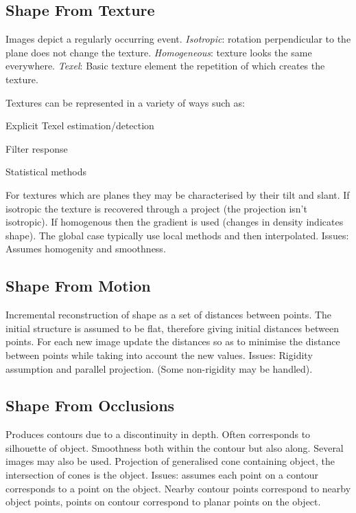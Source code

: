 \documentclass[8pt]{extarticle}
\begin{document}
\begin{multicols}{2}
\subsection{Shape From Texture}
Images depict a regularly occurring event. \textit{Isotropic}: rotation perpendicular to the plane does not change the texture. \textit{Homogeneous}: texture looks the same everywhere. \textit{Texel}: Basic texture element the repetition of which creates the texture.

Textures can be represented in a variety of ways such as:
\begin{compactitem}
    \item Explicit Texel estimation/detection
    \item Filter response
    \item Statistical methods
\end{compactitem}

For textures which are planes they may be characterised by their tilt and slant. If isotropic the texture is recovered through a project (the projection isn't isotropic). If homogenous then the gradient is used (changes in density indicates shape). The global case typically use local methods and then interpolated. Issues: Assumes homogenity and smoothness.

\subsection{Shape From Motion}
Incremental reconstruction of shape as a set of distances between points. The initial structure is assumed to be flat, therefore giving initial distances between points. For each new image update the distances so as to minimise the distance between points while taking into account the new values. Issues: Rigidity assumption and parallel projection. (Some non-rigidity may be handled).

\subsection{Shape From Occlusions}
Produces contours due to a discontinuity in depth. Often corresponds to silhouette of object. Smoothness both within the contour but also along. Several images may also be used. Projection of generalised cone containing object, the intersection of cones is the object. Issues: assumes each point on a contour corresponds to a point on the object. Nearby contour points correspond to nearby object points, points on contour correspond to planar points on the object.


\end{multicols}
\end{document}
